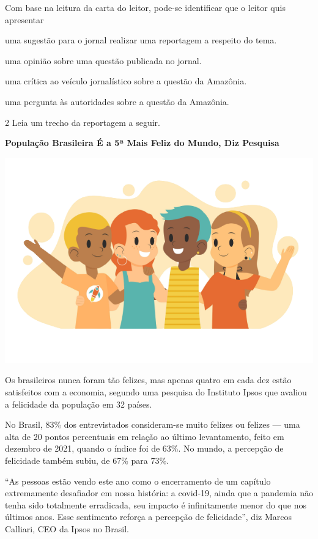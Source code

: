 Com base na leitura da carta do leitor, pode-se identificar que o leitor
quis apresentar

\begin{escolha}
\item uma sugestão para o jornal realizar uma reportagem a respeito do tema.

\item uma opinião sobre uma questão publicada no jornal.

\item uma crítica ao veículo jornalístico sobre a questão da Amazônia.

\item uma pergunta às autoridades sobre a questão da Amazônia.
\end{escolha}

\pagebreak
\num{2} Leia um trecho da reportagem a seguir.

\begin{myquote}
\textbf{População Brasileira É a 5ª Mais Feliz do Mundo, Diz Pesquisa}

\begin{center}
\includegraphics[width=.6\textwidth]{media/image28c.png}
\end{center}

Os brasileiros nunca foram tão felizes, mas apenas quatro em cada dez
estão satisfeitos com a economia, segundo uma pesquisa do Instituto
Ipsos que avaliou a felicidade da população em 32 países.

No Brasil, 83\% dos entrevistados consideram-se muito felizes ou felizes
--- uma alta de 20 pontos percentuais em relação ao último levantamento,
feito em dezembro de 2021, quando o índice foi de 63\%. No mundo, a
percepção de felicidade também subiu, de 67\% para 73\%.

``As pessoas estão vendo este ano como o encerramento de um capítulo
extremamente desafiador em nossa história: a covid-19, ainda que a
pandemia não tenha sido totalmente erradicada, seu impacto é
infinitamente menor do que nos últimos anos. Esse sentimento reforça a
percepção de felicidade'', diz Marcos Calliari, CEO da Ipsos no Brasil.

\end{myquote}

